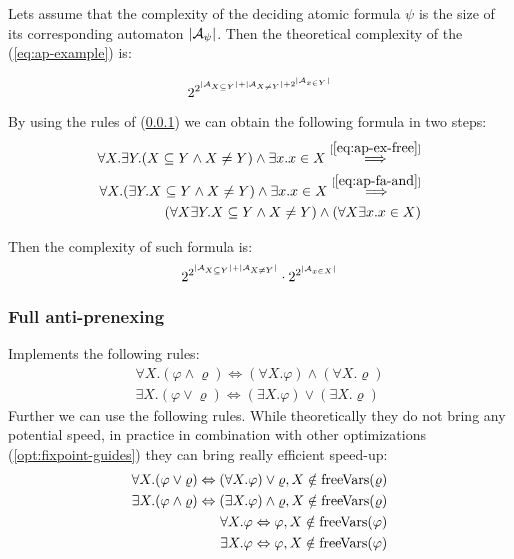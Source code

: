   Lets assume that the complexity of the deciding atomic formula $\psi$ is the size of
  its corresponding automaton $|\mathcal{A}_{\psi}|$. Then the theoretical complexity of 
  the (\ref{eq:ap-example}) is:
  
  \begin{equation}
  2^{2^{|\mathcal{A}_{X \subseteq Y}| + |\mathcal{A}_{X \neq Y}| + 2^{|\mathcal{A}_{x \in Y}|}}}
  \end{equation}
  
  By using the rules of (\ref{opt:full-ap}) we can obtain the following formula in
  two steps:
  \begin{eqnarray}
  \forall X. \exists Y. (X \subseteq Y \wedge X \neq Y) \wedge \exists x. x \in X 
  	\overset{[\ref{eq:ap-ex-free}]}{\Longrightarrow}\\
  \forall X. (\exists Y. X \subseteq Y \wedge X \neq Y) \wedge \exists x. x \in X
  	\overset{[\ref{eq:ap-fa-and}]}{\Longrightarrow}\\
  (\forall X\exists Y. X \subseteq Y \wedge X \neq Y) \wedge (\forall X\exists x. x \in X)
  \end{eqnarray}
  
  Then the complexity of such formula is:
  \begin{equation}
  2^{2^{|\mathcal{A}_{X \subseteq Y}|+|\mathcal{A}_{X \neq Y}|}}\cdot 2^{2^{|\mathcal{A}_{x \in X}|}}
  \end{equation}
 
    \subsubsection{Full anti-prenexing}\label{opt:full-ap}
	Implements the following rules:    
	\begin{eqnarray}
	\forall X. (\varphi \wedge \varrho) \Leftrightarrow 
	  (\forall X. \varphi) \wedge (\forall X. \varrho)\label{eq:ap-fa-and}\\
	\exists X. (\varphi \vee \varrho) \Leftrightarrow
	  (\exists X. \varphi) \vee (\exists X. \varrho)\label{eq:ap-ex-or}
	\end{eqnarray}
	Further we can use the following rules. While theoretically they do not
	bring any potential speed, in practice in combination with other optimizations
	(\ref{opt:fixpoint-guides}) they can bring really efficient speed-up:
	\begin{eqnarray}
	\forall X. (\varphi \vee \varrho) \Leftrightarrow 
	  (\forall X. \varphi) \vee \varrho, X \notin \text{freeVars}(\varrho)\label{eq:ap-fa-free}\\
	\exists X. (\varphi \wedge \varrho) \Leftrightarrow
	  (\exists X. \varphi) \wedge \varrho, X \notin \text{freeVars}(\varrho)\label{eq:ap-ex-free}\\
	\forall X. \varphi \Leftrightarrow \varphi, X \notin\text{freeVars}(\varphi)\\
	\exists X. \varphi \Leftrightarrow \varphi, X \notin\text{freeVars}(\varphi)
	\end{eqnarray}
	
